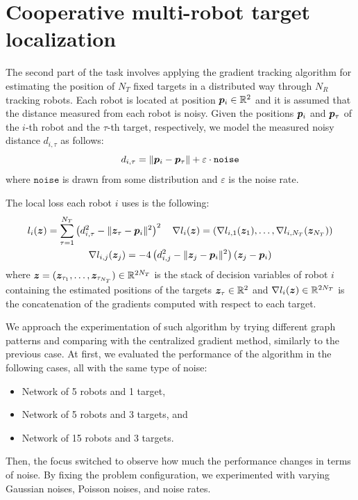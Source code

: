\documentclass[a4paper,11pt,oneside]{book}
\begin{document}
\section{Cooperative multi-robot target localization}

The second part of the task involves applying the gradient tracking algorithm for estimating the position of $N_T$ fixed targets in a distributed way through $N_R$ tracking robots. Each robot is located at position ${\bm{p}}_i \in {\mathbb{R}}^2$ and it is assumed that the distance measured from each robot is noisy. Given the positions ${\bm{p}}_i$ and ${\bm{p}}_\tau$ of the $i$-th robot and the $\tau$-th target, respectively, we model the measured noisy distance $d_{i,\tau}$ as follows:
\[
      d_{i,\tau} = \Vert {\bm{p}}_i - {\bm{p}}_\tau \Vert + \varepsilon \cdot \texttt{noise}
\]
where $\texttt{noise}$ is drawn from some distribution and $\varepsilon$ is the noise rate.

The local loss each robot $i$ uses is the following:
\[
      \begin{gathered}
            l_i({\bm{z}}) = \sum_{\tau=1}^{N_T} \left( d_{i,\tau}^2 - \Vert {\bm{z}}_{\tau} - {\bm{p}}_i \Vert^2 \right)^2
            \quad
            \nabla l_{i}({\bm{z}}) = (\nabla l_{i,1}({\bm{z}}_{1}), \dots, \nabla l_{i,N_T}({\bm{z}}_{N_T}))
            \\
            \nabla l_{i,j}({\bm{z}}_{j}) = -4 \left( d_{i,j}^2 - \Vert {\bm{z}}_{j} - {\bm{p}}_i \Vert^2 \right) \left( {\bm{z}}_{j} - {\bm{p}}_i \right)
      \end{gathered}
\]
where ${\bm{z}} = ({\bm{z}}_{\tau_1}, \dots, {\bm{z}}_{\tau_{N_T}}) \in {\mathbb{R}}^{2N_T}$ is the stack of decision variables of robot $i$ containing the estimated positions of the targets ${\bm{z}}_{\tau} \in {\mathbb{R}}^2$ and $\nabla l_i({\bm{z}}) \in {\mathbb{R}}^{2N_T}$ is the concatenation of the gradients computed with respect to each target.

We approach the experimentation of such algorithm by trying different graph patterns and comparing with the centralized gradient method, similarly to the previous case. At first, we evaluated the performance of the algorithm in the following cases, all with the same type of noise:
\begin{itemize}
      \item Network of 5 robots and 1 target,
      \item Network of 5 robots and 3 targets, and
      \item Network of 15 robots and 3 targets.
\end{itemize}

Then, the focus switched to observe how much the performance changes in terms of noise. By fixing the problem configuration, we experimented with varying Gaussian noises, Poisson noises, and noise rates.
\end{document}
